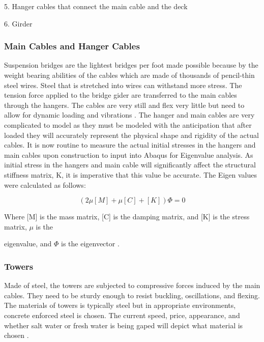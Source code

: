 5. Hanger cables that connect the main cable and the deck

6. Girder 

\subsubsection{Main Cables and Hanger Cables}

Suspension bridges are the lightest bridges per foot made possible because by the weight bearing abilities of the cables which are made of thousands of pencil-thin steel wires. Steel that is stretched into wires can withstand more stress. The tension force applied to the bridge gider are transferred to the main cables through the hangers. The cables are very still and flex very little but need to allow for dynamic loading and vibrations \cite{manoj}. The hanger and main cables are very complicated to model as they must be modeled with the anticipation that after loaded they will accurately represent the physical shape and rigidity of the actual cables. It is now routine to measure the actual initial stresses in the hangers and main cables upon construction to input into Abaqus for Eigenvalue analysis. As initial stress in the hangers and main cable will significantly affect the structural stiffness matrix, K, it is imperative that this value be accurate. The Eigen values were calculated as follows: 


\begin{equation}

( 2 \mu[M] + \mu[C] + [K]){\Phi} = 0

\label{eqn:Euler}

\end{equation}

Where [M] is the mass matrix, [C] is the damping matrix, and [K] is the stress matrix, $\mu$ is the 

eigenvalue, and $\Phi$ is the eigenvector \cite{manoj}. 

\subsubsection{Towers}

Made of steel, the towers are subjected to compressive forces induced by the main cables. They need to be sturdy enough to resist buckling, oscillations, and flexing. The materials of towers is typically steel but in appropriate environments, concrete enforced steel is chosen. The current speed, price, appearance, and whether salt water or fresh water is being gaped will depict what material is chosen \cite{manoj}. 

